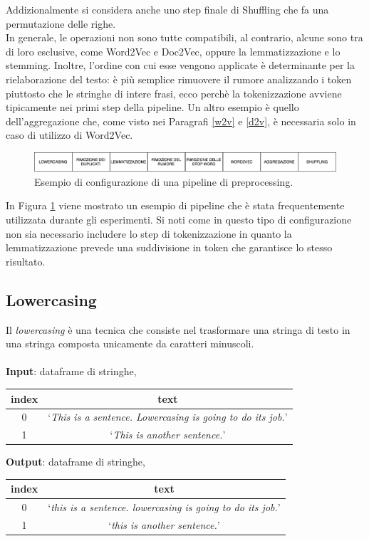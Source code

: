 \documentclass[12pt]{report}
\theoremstyle{definition}
\begin{document}
Addizionalmente si considera anche uno step finale di Shuffling che fa una permutazione delle righe.
\\
In generale, le operazioni non sono tutte compatibili, al contrario, alcune sono tra di loro esclusive, come Word2Vec e Doc2Vec, oppure la lemmatizzazione e lo stemming.
Inoltre, l'ordine con cui esse vengono applicate è determinante per la rielaborazione del testo: è più semplice rimuovere il rumore analizzando i token piuttosto che le stringhe di intere frasi, ecco perchè la tokenizzazione avviene tipicamente nei primi step della pipeline. Un altro esempio è quello dell'aggregazione che, come visto nei Paragrafi \ref{w2v} e \ref{d2v}, è necessaria solo in caso di utilizzo di Word2Vec.
\begin{figure}
    \centering
    \includegraphics[scale=0.45]{images/pipeline.png}
    \caption{Esempio di configurazione di una pipeline di preprocessing.}
    \label{pipeline}
\end{figure}
In Figura \ref{pipeline} viene mostrato un esempio di pipeline che è stata frequentemente utilizzata durante gli esperimenti. Si noti come in questo tipo di configurazione non sia necessario includere lo step di tokenizzazione in quanto la lemmatizzazione prevede una suddivisione in token che garantisce lo stesso risultato.

\subsection{Lowercasing}
Il \textit{lowercasing} è una tecnica che consiste nel trasformare una stringa di testo in una stringa composta unicamente da caratteri minuscoli.
\\
\\
\textbf{Input}: dataframe di stringhe,
\begin{center}
    \begin{tabular}{|c|c|}
    \hline
    \textbf{index} & \textbf{text} \\
    \hline
         0 & `\textit{This is a sentence. Lowercasing is going to do its job.}'\\
         1 & `\textit{This is another sentence.}'\\
    \hline
    \end{tabular}
\end{center}
\textbf{Output}: dataframe di stringhe,
\begin{center}
    \begin{tabular}{|c|c|}
    \hline
    \textbf{index} & \textbf{text} \\
    \hline
         0 & `\textit{this is a sentence. lowercasing is going to do its job.}'\\
         1 & `\textit{this is another sentence.}'\\
    \hline
    \end{tabular}
\end{center}
\end{document}
